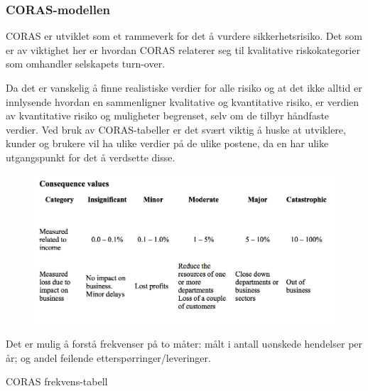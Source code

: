 \subsubsection{CORAS-modellen}

CORAS er utviklet som et rammeverk for det å vurdere sikkerhetsrisiko.
Det som er av viktighet her er hvordan CORAS relaterer seg til
kvalitative riskokategorier som omhandler selskapets turn-over.

Da det er vanskelig å finne realistiske verdier for alle risiko og at
det ikke alltid er innlysende hvordan en sammenligner kvalitative og
kvantitative risiko, er verdien av kvantitative risiko og muligheter
begrenset, selv om de tilbyr håndfaste verdier. Ved bruk av
CORAS-tabeller er det svært viktig å huske at utviklere, kunder og
brukere vil ha ulike verdier på de ulike postene, da en har ulike
utgangspunkt for det å verdsette disse.

\begin{figure}[htbp]
\centering
\includegraphics{Forelesning 08/img/coras.png}
\caption{}
\end{figure}

Det er mulig å forstå frekvenser på to måter: målt i antall uønskede
hendelser per år; og andel feilende etterspørringer/leveringer.

CORAS frekvens-tabell

